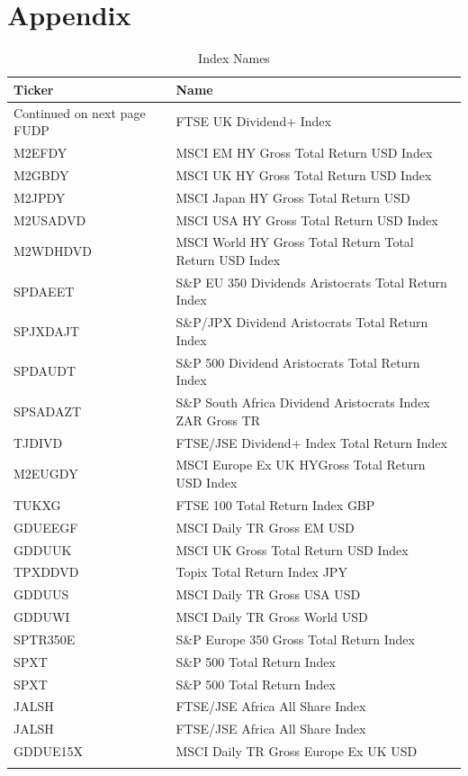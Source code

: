 \documentclass[11pt,preprint, authoryear]{elsarticle}
\numberwithin{equation}{section}
\numberwithin{figure}{section}
\numberwithin{table}{section}
\begin{document}
\hypertarget{appendix}{%
\section*{Appendix}\label{appendix}}

\begingroup\fontsize{8pt}{9pt}\selectfont
\begin{longtable}{ll}
  \toprule
Ticker & Name \\ 
  \hline 
\endhead 
\hline 
{\footnotesize Continued on next page} 
\endfoot 
\endlastfoot 
 \midrule
FUDP & FTSE UK Dividend+ Index \\ 
  M2EFDY & MSCI EM HY Gross Total Return USD Index \\ 
  M2GBDY & MSCI UK HY Gross Total Return USD Index \\ 
  M2JPDY & MSCI Japan HY Gross Total Return USD \\ 
  M2USADVD & MSCI USA HY Gross Total Return USD Index \\ 
  M2WDHDVD & MSCI World HY Gross Total Return Total Return USD Index \\ 
  SPDAEET & S\&P EU 350 Dividends Aristocrats Total Return Index \\ 
  SPJXDAJT & S\&P/JPX Dividend Aristocrats Total Return Index \\ 
  SPDAUDT & S\&P 500 Dividend Aristocrats Total Return Index \\ 
  SPSADAZT & S\&P South Africa Dividend Aristocrats Index ZAR Gross TR \\ 
  TJDIVD & FTSE/JSE Dividend+ Index Total Return Index \\ 
  M2EUGDY & MSCI Europe Ex UK HYGross Total Return USD Index \\ 
  TUKXG & FTSE 100 Total Return Index GBP \\ 
  GDUEEGF & MSCI Daily TR Gross EM USD \\ 
  GDDUUK & MSCI UK Gross Total Return USD Index \\ 
  TPXDDVD & Topix Total Return Index JPY \\ 
  GDDUUS & MSCI Daily TR Gross USA USD \\ 
  GDDUWI & MSCI Daily TR Gross World USD \\ 
  SPTR350E & S\&P Europe 350 Gross Total Return Index \\ 
  SPXT & S\&P 500 Total Return Index \\ 
  SPXT & S\&P 500 Total Return Index \\ 
  JALSH & FTSE/JSE Africa All Share Index \\ 
  JALSH & FTSE/JSE Africa All Share Index \\ 
  GDDUE15X & MSCI Daily TR Gross Europe Ex UK USD \\ 
   \bottomrule
\caption{Index Names \label{tabdes}} 
\end{longtable}
\endgroup
\end{document}
